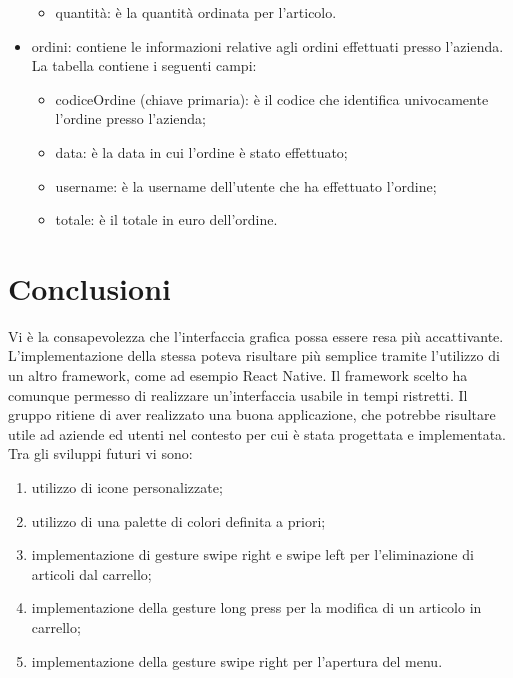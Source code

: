 \documentclass[12pt, a4paper, titlepage]{report}
\begin{document}
\begin{itemize}
\begin{itemize}
			\item quantità: è la quantità ordinata per l'articolo.
		\end{itemize}
		\item ordini: contiene le informazioni relative agli ordini effettuati presso l'azienda. La tabella contiene i seguenti campi:
		\begin{itemize}
			\item codiceOrdine (chiave primaria): è il codice che identifica univocamente l'ordine presso l'azienda;
			\item data: è la data in cui l'ordine è stato effettuato;
			\item username: è la username dell'utente che ha effettuato l'ordine;
			\item totale: è il totale in euro dell'ordine.
		\end{itemize}
	\end{itemize}
	
	\section{Conclusioni}
	
	Vi è la consapevolezza che l'interfaccia grafica possa essere resa più accattivante. L'implementazione della stessa poteva risultare più semplice tramite l'utilizzo di un altro framework, come ad esempio React Native. Il framework scelto ha comunque permesso di realizzare un'interfaccia usabile in tempi ristretti. Il gruppo ritiene di aver realizzato una buona applicazione, che potrebbe risultare utile ad aziende ed utenti nel contesto per cui è stata progettata e implementata. Tra gli sviluppi futuri vi sono:
	\begin{enumerate}
		\item utilizzo di icone personalizzate;
		\item utilizzo di una palette di colori definita a priori;
		\item implementazione di gesture swipe right e swipe left per l'eliminazione di articoli dal carrello;
		\item implementazione della gesture long press per la modifica di un articolo in carrello;
		\item implementazione della gesture swipe right per l'apertura del menu.
	\end{enumerate} 
\end{document}
